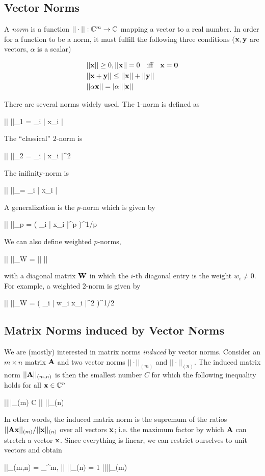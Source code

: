 
\subsection{Vector Norms}

A \emph{norm} is a function $|| \cdot || : \mathbb{C}^m \rightarrow \mathbb{C}$ mapping a vector to a real number. In order for a function to be a norm, it must fulfill the following three conditions ($\mathbf{x}, \mathbf{y}$ are vectors, $\alpha$ is a scalar)

\begin{align*}
  & || \mathbf{x} || \geq 0, || \mathbf{x} || = 0 \quad \text{iff} \quad \mathbf{x} = \mathbf{0} \\
  & || \mathbf{x} + \mathbf{y} || \leq || \mathbf{x} || + || \mathbf{y} || \\
  & || \alpha \mathbf{x} || = |\alpha| || \mathbf{x} ||
\end{align*}

There are several norms widely used. The $1$-norm is defined as

\bee
|| \xbf ||_1 = \sum_i | x_i |
\eee

The ``classical'' $2$-norm is

\bee
|| \xbf ||_2 = \sum_i | x_i |^2
\eee

The inifinity-norm is

\bee
|| \xbf ||_\infty = \max_i | x_i |
\eee

A generalization is the $p$-norm which is given by

\bee
|| \xbf ||_p = \left( \sum_i | x_i |^p \right)^{1/p}
\eee

We can also define weighted $p$-norms,

\bee
|| \xbf ||_W = || \Wbf \xbf ||
\eee

with a diagonal matrix $\mathbf{W}$ in which the $i$-th diagonal entry is the weight $w_i \neq 0$. For example, a weighted $2$-norm is given by

\bee
|| \xbf ||_W = \left( \sum_i | w_i x_i |^2 \right)^{1/2}
\eee

\subsection{Matrix Norms induced by Vector Norms}

We are (mostly) interested in matrix norms \emph{induced} by vector norms. Consider an $m \times n$ matrix $\mathbf{A}$ and two vector norms $||\cdot||_{(m)}$ and $||\cdot||_{(n)}$. The induced matrix norm $||\mathbf{A} ||_{(m,n)}$ is then the smallest number $C$ for which the following inequality holds for all $\mathbf{x} \in \mathbb{C}^n$

\bee
||\Abf \xbf ||_{(m)} \leq C || \xbf ||_{(n)}
\eee

In other words, the induced matrix norm is the supremum of the ratios $||\mathbf{A} \mathbf{x} ||_{(m)} / ||\mathbf{x} ||_{(n)}$ over all vectors $\mathbf{x}$; i.e. the maximum factor by which $\mathbf{A}$ can stretch a vector $\mathbf{x}$. Since everything is linear, we can restrict ourselves to unit vectors and obtain

\bee
\Abf ||_{(m,n)} = \sup_{\xbf \in \mC^m, || \xbf||_{(n)} = 1} ||\Abf \xbf ||_{(m)}
\eee


